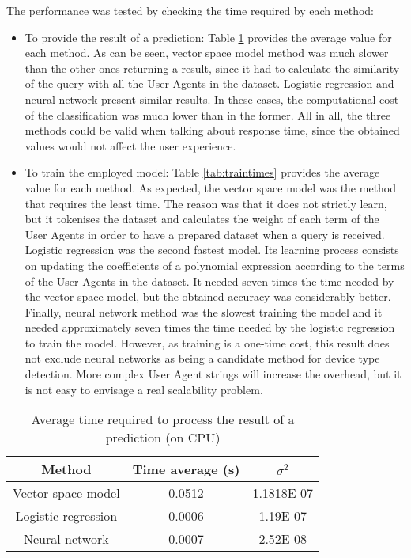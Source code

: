 The performance was tested by checking the time required by each method:
\begin{itemize}
	\item To provide the result of a prediction: Table \ref{tab:querytimes} provides the average value for each method. As can be seen, vector space model method was much slower than the other ones returning a result, since it had to calculate the similarity of the query with all the User Agents in the dataset. Logistic regression and neural network present similar results. In these cases, the computational cost of the classification was much lower than in the former. All in all, the three methods could be valid when talking about response time, since the obtained values would not affect the user experience. 
	\item To train the employed model: Table \ref{tab:traintimes} provides the average value for each method. As expected, the vector space model was the method that requires the least time. The reason was that it does not strictly learn, but it tokenises the dataset and calculates the weight of each term of the User Agents in order to have a prepared dataset when a query is received. Logistic regression was the second fastest model. Its learning process consists on updating the coefficients of a polynomial expression according to the terms of the User Agents in the dataset. It needed seven times the time needed by the vector space model, but the obtained accuracy was considerably better. Finally, neural network method was the slowest training the model and it needed approximately seven times the time needed by the logistic regression to train the model. However, as training is a one-time cost, this result does not exclude neural networks as being a candidate method for device type detection. More complex User Agent strings will increase the overhead, but it is not easy to envisage a real scalability problem.
\end{itemize}

\begin{table}
	\centering
	\caption{Average time required to process the result of a prediction (on CPU)}
	\label{tab:querytimes}
	\begin{tabular}{||c|c|c||}
		\hline
		\textbf{Method} & \textbf{Time average (s)} & \textbf{$\sigma^2$}\\
		\hline
		Vector space model & 0.0512 & 1.1818E-07\\
		Logistic regression & 0.0006 & 1.19E-07\\
		Neural network & 0.0007 & 2.52E-08\\    
		\hline
	\end{tabular}
\end{table}

